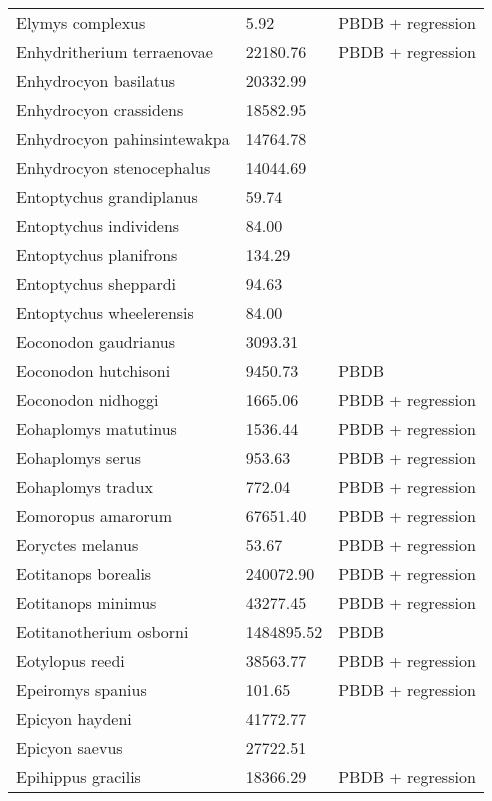 \documentclass{article}
\begin{document}
\begin{center}
\begin{longtable}{p{} p{} p{}}
    Elymys complexus & 5.92 & PBDB + regression \\ 
    Enhydritherium terraenovae & 22180.76 & PBDB + regression \\ 
    Enhydrocyon basilatus & 20332.99 & \cite{Tomiya2013} \\ 
    Enhydrocyon crassidens & 18582.95 & \cite{Tomiya2013} \\ 
    Enhydrocyon pahinsintewakpa & 14764.78 & \cite{Tomiya2013} \\ 
    Enhydrocyon stenocephalus & 14044.69 & \cite{Tomiya2013} \\ 
    Entoptychus grandiplanus & 59.74 & \cite{Tomiya2013} \\ 
    Entoptychus individens & 84.00 & \cite{McKenna2011} \\ 
    Entoptychus planifrons & 134.29 & \cite{Tomiya2013} \\ 
    Entoptychus sheppardi & 94.63 & \cite{Tomiya2013} \\ 
    Entoptychus wheelerensis & 84.00 & \cite{McKenna2011} \\ 
    Eoconodon gaudrianus & 3093.31 & \cite{Zonneveld2003} \\ 
    Eoconodon hutchisoni & 9450.73 & PBDB \\ 
    Eoconodon nidhoggi & 1665.06 & PBDB + regression \\ 
    Eohaplomys matutinus & 1536.44 & PBDB + regression \\ 
    Eohaplomys serus & 953.63 & PBDB + regression \\ 
    Eohaplomys tradux & 772.04 & PBDB + regression \\ 
    Eomoropus amarorum & 67651.40 & PBDB + regression \\ 
    Eoryctes melanus & 53.67 & PBDB + regression \\ 
    Eotitanops borealis & 240072.90 & PBDB + regression \\ 
    Eotitanops minimus & 43277.45 & PBDB + regression \\ 
    Eotitanotherium osborni & 1484895.52 & PBDB \\ 
    Eotylopus reedi & 38563.77 & PBDB + regression \\ 
    Epeiromys spanius & 101.65 & PBDB + regression \\ 
    Epicyon haydeni & 41772.77 & \cite{Tomiya2013} \\ 
    Epicyon saevus & 27722.51 & \cite{Tomiya2013} \\ 
    Epihippus gracilis & 18366.29 & PBDB + regression \\ 

\end{longtable}
\end{center}
\end{document}

